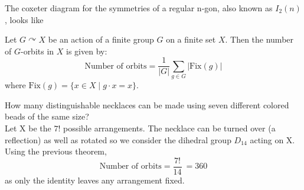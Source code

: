 \documentclass[../main.tex]{subfiles}
\begin{document}
\begin{example}
The coxeter diagram for the symmetries of a regular n-gon, also known as $I_{2}(n)$, looks like
    \begin{figure}[H]
    \centering

\end{figure}
\end{example}


\begin{theorem}[]
\label{}
Let \( G \curvearrowright X \) be an action of a finite group \( G \) on a finite set \( X \).  
Then the number of \( G \)-orbits in \( X \) is given by:
\[
\text{Number of orbits} = \frac{1}{|G|} \sum_{g \in G} |\mathrm{Fix}(g)|
\]
where \( \mathrm{Fix}(g) = \{ x \in X \mid g \cdot x = x \} \).
\end{theorem}

\begin{example}
How many distinguishable necklaces can be made using seven different colored beads of the same size?\\
    Let X be the $7!$ possible arrangements. The necklace can be turned over (a reflection) as well as rotated so we consider the dihedral group $D_{14}$ acting on X. Using the previous theorem, 
\[
\text{Number of orbits} = \frac{7!}{14}\ = 360
\]
as only the identity leaves any arrangement fixed.
\end{example}
\end{document}
